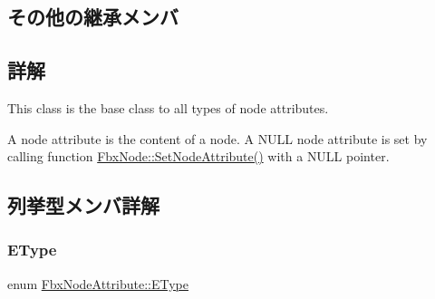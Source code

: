 \subsection*{その他の継承メンバ}


\subsection{詳解}
This class is the base class to all types of node attributes.

A node attribute is the content of a node. A {\ttfamily N\+U\+LL} node attribute is set by calling function \hyperlink{class_fbx_node_adb194a043dd1ccf3bc1e3bda520dc97a}{Fbx\+Node\+::\+Set\+Node\+Attribute()} with a {\ttfamily N\+U\+LL} pointer. 

\subsection{列挙型メンバ詳解}
\mbox{\label{class_fbx_node_attribute_a08e1669d3d1a696910756ab17de56d6a}} 
\subsubsection{\texorpdfstring{E\+Type}{EType}}
{\footnotesize\ttfamily enum \hyperlink{class_fbx_node_attribute_a08e1669d3d1a696910756ab17de56d6a}{Fbx\+Node\+Attribute\+::\+E\+Type}}

